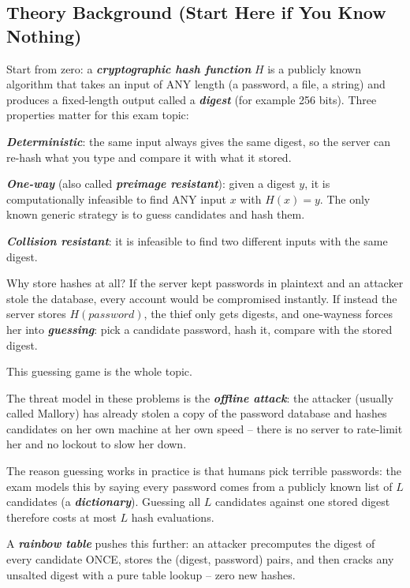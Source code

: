 \documentclass[12pt, a4paper]{article}
\newcommand{\term}[1]{\textbf{\textit{#1}}}        %
\begin{document}
\subsection*{Theory Background (Start Here if You Know Nothing)}

Start from zero: a \term{cryptographic hash function} $H$ is a publicly known algorithm that takes an input of ANY length (a password, a file, a string) and produces a fixed-length output called a \term{digest} (for example 256 bits). Three properties matter for this exam topic:
\begin{tightitem}
    \item \term{Deterministic}: the same input always gives the same digest, so the server can re-hash what you type and compare it with what it stored.
    \item \term{One-way} (also called \term{preimage resistant}): given a digest $y$, it is computationally infeasible to find ANY input $x$ with $H(x) = y$. The only known generic strategy is to guess candidates and hash them.
    \item \term{Collision resistant}: it is infeasible to find two different inputs with the same digest.
\end{tightitem}
Why store hashes at all? If the server kept passwords in plaintext and an attacker stole the database, every account would be compromised instantly. If instead the server stores $H(password)$, the thief only gets digests, and one-wayness forces her into \term{guessing}: pick a candidate password, hash it, compare with the stored digest.

This guessing game is the whole topic.

The threat model in these problems is the \term{offline attack}: the attacker (usually called Mallory) has already stolen a copy of the password database and hashes candidates on her own machine at her own speed -- there is no server to rate-limit her and no lockout to slow her down.

The reason guessing works in practice is that humans pick terrible passwords: the exam models this by saying every password comes from a publicly known list of $L$ candidates (a \term{dictionary}). Guessing all $L$ candidates against one stored digest therefore costs at most $L$ hash evaluations.

A \term{rainbow table} pushes this further: an attacker precomputes the digest of every candidate ONCE, stores the (digest, password) pairs, and then cracks any unsalted digest with a pure table lookup -- zero new hashes.
\end{document}

